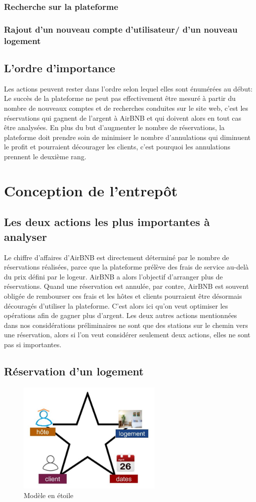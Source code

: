 \documentclass[11pt]{article}
\begin{document}
\subsubsection*{Recherche sur la plateforme}
\subsubsection*{Rajout d'un nouveau compte d'utilisateur/ d'un nouveau logement}
\subsection{L'ordre d'importance}
Les actions peuvent rester dans l'ordre selon lequel elles sont énumérées au début: Le succès de la plateforme ne peut pas effectivement être mesuré à partir du nombre de nouveaux comptes et de recherches conduites sur le site web, c'est les réservations qui gagnent de l'argent à AirBNB et qui doivent alors en tout cas être analysées. 
En plus du but d'augmenter le nombre de réservations, la plateforme doit prendre soin de minimiser le nombre d'annulations qui diminuent le profit et pourraient décourager les clients, c'est pourquoi les annulations prennent le deuxième rang.
\section{Conception de l'entrepôt}
\subsection{Les deux actions les plus importantes à analyser}
Le chiffre d'affaires d'AirBNB est directement déterminé par le nombre de réservations réalisées, parce que la plateforme prélève des frais de service au-delà du prix défini par le logeur. AirBNB a alors l'objectif d'arranger plus de réservations. Quand une réservation est annulée, par contre, AirBNB est souvent obligée de rembourser ces frais et les hôtes et clients pourraient être désormais découragés d'utiliser la plateforme. C'est alors ici qu'on veut optimiser les opérations afin de gagner plus d'argent. Les deux autres actions mentionnées dans nos considérations préliminaires ne sont que des stations sur le chemin vers une réservation, alors si l'on veut considérer seulement deux actions, elles ne sont pas si importantes.
\subsection{Réservation d'un logement}
\begin{figure}[h]
	\centering
	\includegraphics*[width=7cm]{img/modele_etoile.jpg}
	\caption{Modèle en étoile}
\end{figure}
\end{document}
